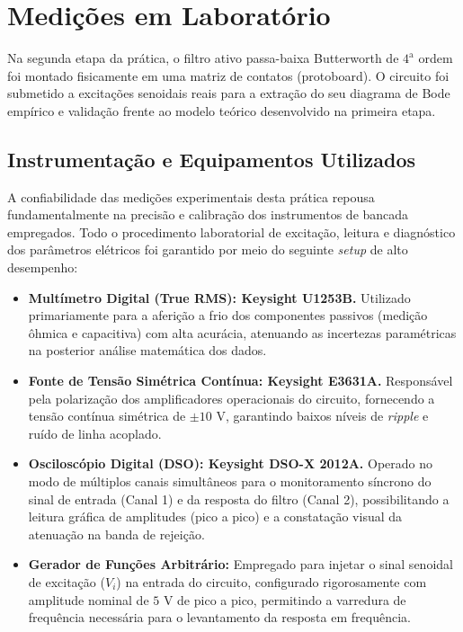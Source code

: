 \chapter{Medições em Laboratório}

Na segunda etapa da prática, o filtro ativo passa-baixa Butterworth de $4^{\text{a}}$ ordem foi montado fisicamente em uma matriz de contatos (protoboard). O circuito foi submetido a excitações senoidais reais para a extração do seu diagrama de Bode empírico e validação frente ao modelo teórico desenvolvido na primeira etapa.

\section{Instrumentação e Equipamentos Utilizados}

A confiabilidade das medições experimentais desta prática repousa fundamentalmente na precisão e calibração dos instrumentos de bancada empregados. Todo o procedimento laboratorial de excitação, leitura e diagnóstico dos parâmetros elétricos foi garantido por meio do seguinte \textit{setup} de alto desempenho:

\begin{itemize}
	\item \textbf{Multímetro Digital (True RMS): Keysight U1253B.} Utilizado primariamente para a aferição a frio dos componentes passivos (medição ôhmica e capacitiva) com alta acurácia, atenuando as incertezas paramétricas na posterior análise matemática dos dados.
	\item \textbf{Fonte de Tensão Simétrica Contínua: Keysight E3631A.} Responsável pela polarização dos amplificadores operacionais do circuito, fornecendo a tensão contínua simétrica de $\pm 10\text{ V}$, garantindo baixos níveis de \textit{ripple} e ruído de linha acoplado.
	\item \textbf{Osciloscópio Digital (DSO): Keysight DSO-X 2012A.} Operado no modo de múltiplos canais simultâneos para o monitoramento síncrono do sinal de entrada (Canal 1) e da resposta do filtro (Canal 2), possibilitando a leitura gráfica de amplitudes (pico a pico) e a constatação visual da atenuação na banda de rejeição.
	\item \textbf{Gerador de Funções Arbitrário:} Empregado para injetar o sinal senoidal de excitação ($V_i$) na entrada do circuito, configurado rigorosamente com amplitude nominal de $5\text{ V}$ de pico a pico, permitindo a varredura de frequência necessária para o levantamento da resposta em frequência.
\end{itemize}

